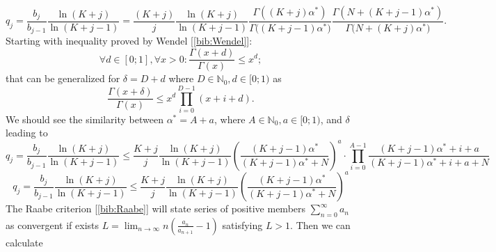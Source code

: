 \begin{equation}
q_j = \frac{b_{j}}{b_{j-1}}\frac{\ln(K+j)}{\ln(K+j-1)}  = \frac{(K+j)}{j}\frac{\ln(K+j)}{\ln(K+j-1)} \frac{\Gamma{((K+j)\alpha^{*})}}{\Gamma{((K+j-1)\alpha^{*}})}\frac{\Gamma{(N+(K+j-1)\alpha^{*})}}{\Gamma({N+(K+j)\alpha^{*})}}.
\end{equation}
Starting with inequality proved by Wendel [\ref{bib:Wendel}]:
\begin{equation}
\forall d \in [0;1], \forall x > 0: \frac{ \Gamma(x + d)}{\Gamma(x)} \leq x^{d};
\end{equation}
that can be generalized for $\delta = D + d$ where $D \in \mathbb{N}_0, d \in [0;1)$ as
\begin{equation}
\frac{ \Gamma(x + \delta)}{\Gamma(x)} \leq x^{d} \prod^{D-1}_{i=0}(x+i+d).
\end{equation}
We should see the similarity between $\alpha^{*} = A + a$, where $A \in \mathbb{N}_0, a \in [0;1)$, and $\delta$ leading to
\begin{equation}
q_j = \frac{b_j}{b_{j-1}} \frac{\ln(K+j)}{\ln(K+j-1)} \leq  \frac{K+j}{j}\frac{\ln(K+j)}{\ln(K+j-1)} {\left( \frac{(K+j-1)\alpha^*}{(K+j-1)\alpha^* + N} \right)}^{a} \cdot \prod^{A-1}_{i=0}\frac{(K+j-1)\alpha^*+i+a}{(K+j-1)\alpha^*+i+a+N}
\end{equation}
\begin{equation}
q_j = \frac{b_j}{b_{j-1}} \frac{\ln(K+j)}{\ln(K+j-1)} \leq  \frac{K+j}{j}\frac{\ln(K+j)}{\ln(K+j-1)} {\left( \frac{(K+j-1)\alpha^*}{(K+j-1)\alpha^* + N} \right)}^{a}
\end{equation}
The Raabe criterion [\ref{bib:Raabe}] will state series of positive members $\sum_{n=0}^{\infty} a_n$ as convergent if exists $L = \lim_{n \to \infty} n \left(\frac{a_n}{a_{n+1}}-1 \right)$ satisfying $L>1$. Then we can calculate

